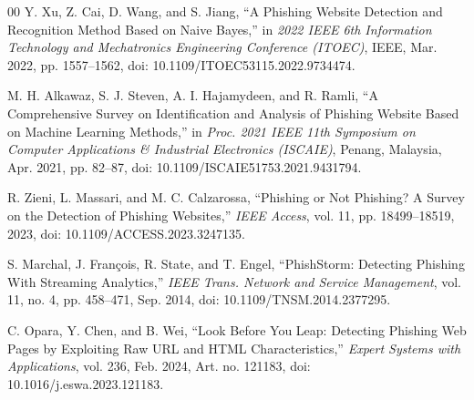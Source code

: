 \documentclass[conference]{IEEEtran}
\begin{document}
\begin{thebibliography}{00}
Y. Xu, Z. Cai, D. Wang, and S. Jiang, ``A Phishing Website Detection and Recognition Method Based on Naive Bayes,'' in \textit{2022 IEEE 6th Information Technology and Mechatronics Engineering Conference (ITOEC)}, IEEE, Mar. 2022, pp. 1557--1562, doi: 10.1109/ITOEC53115.2022.9734474.

M. H. Alkawaz, S. J. Steven, A. I. Hajamydeen, and R. Ramli, ``A Comprehensive Survey on Identification and Analysis of Phishing Website Based on Machine Learning Methods,'' in \textit{Proc. 2021 IEEE 11th Symposium on Computer Applications \& Industrial Electronics (ISCAIE)}, Penang, Malaysia, Apr. 2021, pp. 82--87, doi: 10.1109/ISCAIE51753.2021.9431794.

R. Zieni, L. Massari, and M. C. Calzarossa, ``Phishing or Not Phishing? A Survey on the Detection of Phishing Websites,'' \textit{IEEE Access}, vol. 11, pp. 18499--18519, 2023, doi: 10.1109/ACCESS.2023.3247135.

S. Marchal, J. François, R. State, and T. Engel, ``PhishStorm: Detecting Phishing With Streaming Analytics,'' \textit{IEEE Trans. Network and Service Management}, vol. 11, no. 4, pp. 458--471, Sep. 2014, doi: 10.1109/TNSM.2014.2377295.

C. Opara, Y. Chen, and B. Wei, ``Look Before You Leap: Detecting Phishing Web Pages by Exploiting Raw URL and HTML Characteristics,'' \textit{Expert Systems with Applications}, vol. 236, Feb. 2024, Art. no. 121183, doi: 10.1016/j.eswa.2023.121183.

\end{thebibliography}
\end{document}
